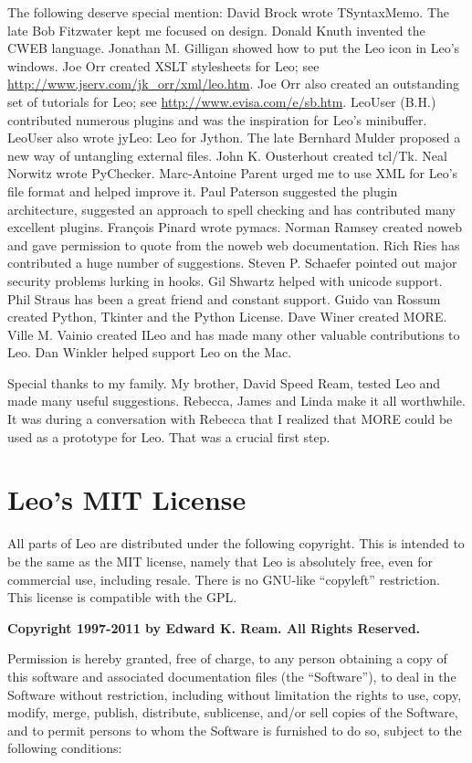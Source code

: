 \documentclass[a4paper,10pt,english]{sphinxmanual}
\begin{document}
The following deserve special mention:
David Brock wrote TSyntaxMemo.
The late Bob Fitzwater kept me focused on design.
Donald Knuth invented the CWEB language.
Jonathan M. Gilligan showed how to put the Leo icon in Leo's windows.
Joe Orr created XSLT stylesheets for Leo; see \href{http://www.jserv.com/jk\_orr/xml/leo.htm}{http://www.jserv.com/jk\_orr/xml/leo.htm}.
Joe Orr also created an outstanding set of tutorials for Leo; see \href{http://www.evisa.com/e/sb.htm}{http://www.evisa.com/e/sb.htm}.
LeoUser (B.H.) contributed numerous plugins and was the inspiration for Leo's minibuffer.
LeoUser also wrote jyLeo: Leo for Jython.
The late Bernhard Mulder proposed a new way of untangling external files.
John K. Ousterhout created tcl/Tk. Neal Norwitz wrote PyChecker.
Marc-Antoine Parent urged me to use XML for Leo's file format and helped improve it.
Paul Paterson suggested the plugin architecture,
suggested an approach to spell checking and has contributed many excellent plugins.
François Pinard wrote pymacs.
Norman Ramsey created noweb and gave permission to quote from the noweb web documentation.
Rich Ries has contributed a huge number of suggestions.
Steven P. Schaefer pointed out major security problems lurking in hooks.
Gil Shwartz helped with unicode support.
Phil Straus has been a great friend and constant support.
Guido van Rossum created Python, Tkinter and the Python License.
Dave Winer created MORE.
Ville M. Vainio created ILeo and has made many other valuable contributions to Leo.
Dan Winkler helped support Leo on the Mac.

Special thanks to my family.
My brother, David Speed Ream, tested Leo and made many useful suggestions.
Rebecca, James and Linda make it all worthwhile.
It was during a conversation with Rebecca that I realized that MORE could be used as a prototype for Leo.
That was a crucial first step.


\section{Leo's MIT License}
\label{frontMatter:leo-s-mit-license}
All parts of Leo are distributed under the following copyright. This is intended
to be the same as the MIT license, namely that Leo is absolutely free, even for
commercial use, including resale. There is no GNU-like ``copyleft'' restriction.
This license is compatible with the GPL.

\textbf{Copyright 1997-2011 by Edward K. Ream. All Rights Reserved.}

Permission is hereby granted, free of charge, to any person obtaining a copy of
this software and associated documentation files (the ``Software''), to deal in
the Software without restriction, including without limitation the rights to
use, copy, modify, merge, publish, distribute, sublicense, and/or sell copies of
the Software, and to permit persons to whom the Software is furnished to do so,
subject to the following conditions:
\end{document}
